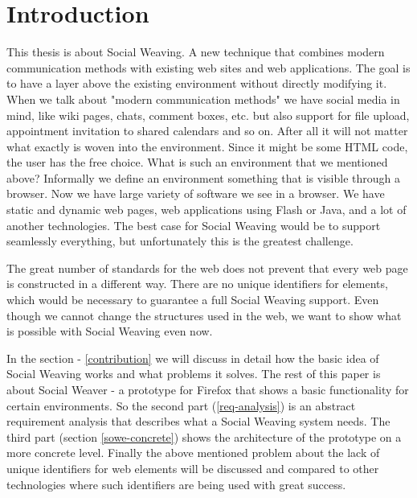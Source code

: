 \section{Introduction}

This thesis is about Social Weaving. A new technique that combines modern communication methods with existing web sites and web applications. The goal is to have a layer above the existing environment without directly modifying it. When we talk about "modern communication methods" we have social media in mind, like wiki pages, chats, comment boxes, etc. but also support for file upload, appointment invitation to shared calendars and so on. After all it will not matter what exactly is woven into the environment. Since it might be some HTML code, the user has the free choice. What is such an environment that we mentioned above? Informally we define an environment something that is visible through a browser. Now we have large variety of software we see in a browser. We have static and dynamic web pages, web applications using Flash or Java, and a lot of another technologies. The best case for Social Weaving would be to support seamlessly everything, but unfortunately this is the greatest challenge. 

The great number of standards for the web does not prevent that every web page is constructed in a different way. There are no unique identifiers for elements, which would be necessary to guarantee a full Social Weaving support. Even though we cannot change the structures used in the web, we want to show what is possible with Social Weaving even now. 

In the section  - \ref{contribution} we will discuss in detail how the basic idea of Social Weaving works and what problems it solves. The rest of this paper is about Social Weaver - a prototype for Firefox that shows a basic functionality for certain environments. So the second part (\ref{req-analysis}) is an abstract requirement analysis that describes what a Social Weaving system needs. The third part (section \ref{sowe-concrete}) shows the architecture of the prototype on a more concrete level. Finally the above mentioned problem about the lack of unique identifiers for web elements will be discussed and compared to other technologies where such identifiers are being used with great success. 